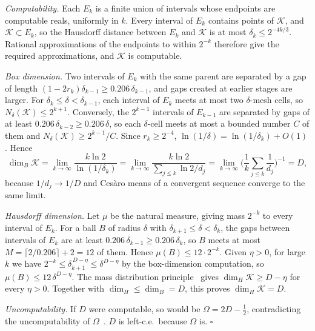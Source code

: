 \documentclass[11pt]{article}
\theoremstyle{definition}\newtheorem{definition}{Definition}[section]
\theoremstyle{remark}\newtheorem*{remark}{Remark}
\begin{document}
\emph{Computability.} Each $E_k$ is a finite union of intervals whose endpoints are computable reals, uniformly in
$k$. Every interval of $E_k$ contains points of $\mathcal K$, and $\mathcal K\subset E_k$, so the Hausdorff distance between $E_k$ and
$\mathcal K$ is at most $\delta_k\le2^{-4k/3}$. Rational approximations of the endpoints to within $2^{-k}$ therefore give
the required approximations, and $\mathcal K$ is computable.

\emph{Box dimension.} Two intervals of $E_k$ with the same parent are separated by a gap of length
$(1-2r_k)\delta_{k-1}\ge0.206\,\delta_{k-1}$, and gaps created at earlier stages are larger. For
$\delta_k\le\delta<\delta_{k-1}$, each interval of $E_k$ meets at most two $\delta$-mesh cells, so
$N_\delta(\mathcal K)\le2^{k+1}$. Conversely, the $2^{k-1}$ intervals of $E_{k-1}$ are separated by gaps of at least
$0.206\,\delta_{k-2}\ge0.206\,\delta$, so each $\delta$-cell meets at most a bounded number $C$ of them and
$N_\delta(\mathcal K)\ge2^{k-1}/C$. Since $r_k\ge2^{-4}$, $\ln(1/\delta)=\ln(1/\delta_k)+O(1)$. Hence
\begin{equation}
\dim_B\mathcal K=\lim_{k\to\infty}\frac{k\ln2}{\ln(1/\delta_k)}=\lim_{k\to\infty}\frac{k\ln2}{\sum_{j\le k}\ln2/d_j}
=\lim_{k\to\infty}\Big(\frac1k\sum_{j\le k}\frac1{d_j}\Big)^{-1}=D,
\end{equation}
because $1/d_j\to1/D$ and Ces\`aro means of a convergent sequence converge to the same limit.

\emph{Hausdorff dimension.} Let $\mu$ be the natural measure, giving mass $2^{-k}$ to every interval of $E_k$. For a
ball $B$ of radius $\delta$ with $\delta_{k+1}\le\delta<\delta_k$, the gaps between intervals of $E_k$ are at least
$0.206\,\delta_{k-1}\ge0.206\,\delta_k$, so $B$ meets at most $M=\lceil2/0.206\rceil+2=12$ of them. Hence
$\mu(B)\le12\cdot2^{-k}$. Given $\eta>0$, for large $k$ we have $2^{-k}\le\delta_{k+1}^{\,D-\eta}\le\delta^{D-\eta}$ by the box-dimension
computation, so $\mu(B)\le12\,\delta^{D-\eta}$. The mass distribution principle~\cite{Falconer} gives
$\dim_H\mathcal K\ge D-\eta$ for every $\eta>0$. Together with $\dim_H\le\dim_B=D$, this proves $\dim_H\mathcal K=D$.

\emph{Uncomputability.} If $D$ were computable, so would be $\Omega=2D-\frac12$, contradicting the uncomputability of
$\Omega$~\cite{Chaitin75}. $D$ is left-c.e.\ because $\Omega$ is. \hfill$\square$
\end{document}

